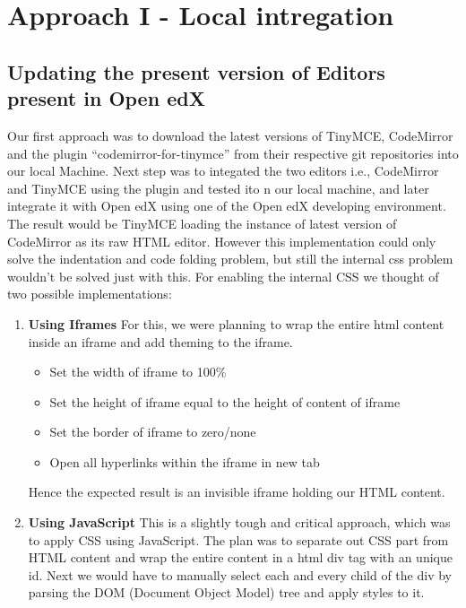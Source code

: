 
\chapter{Approach I - Local intregation}
\section{Updating the present version of Editors present in Open edX}
Our first approach was to download the latest versions of TinyMCE, CodeMirror and
the plugin “codemirror-for-tinymce” from their respective git repositories into our local
Machine.\newline
Next step was to integated the two editors i.e., CodeMirror and TinyMCE using the plugin and
tested ito n our local machine, and later integrate it with Open edX using one of the Open edX developing
environment.\newline
The result would be TinyMCE loading the instance of latest version of CodeMirror as its
raw HTML editor.
However this implementation could only solve the indentation and code folding problem,
but still the internal css problem wouldn’t be solved just with this.\newline\newline
For enabling the internal CSS we thought of two possible implementations:
\begin{enumerate}
\item\textbf{Using Iframes}\newline
For this, we were planning to wrap the entire html content inside an iframe
and add theming to the iframe.
\begin{itemize}
\item Set the width of iframe to 100\%
\item Set the height of iframe equal to the height of content of iframe
\item Set the border of iframe to zero/none
\item Open all hyperlinks within the iframe in new tab
\end{itemize}
Hence the expected result is an invisible iframe holding our HTML content.



\item\textbf{Using JavaScript}\newline
This is a slightly tough and critical approach, which was to apply CSS using
JavaScript. The plan was to separate out CSS part from HTML content and
wrap the entire content in a html div tag with an unique id.
Next we would have to manually select each and every child of the div by
parsing the DOM (Document Object Model) tree and apply styles to it.\newline
\end{enumerate}

